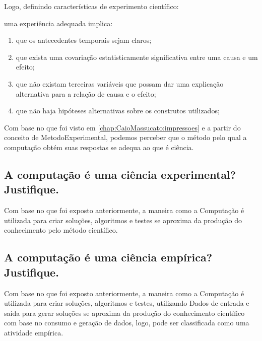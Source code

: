 Logo, definindo características de experimento científico:

uma experiência adequada implica:

\begin{enumerate}
    \item que os antecedentes temporais sejam claros;
    \item que exista uma covariação estatisticamente significativa entre uma causa e um efeito;
    \item que não existam terceiras variáveis que possam dar uma explicação alternativa para a relação de causa e o efeito;
    \item que não haja hipóteses alternativas sobre os construtos utilizados;
\end{enumerate}

Com base no que foi visto em \ref{chap:CaioMassucato:impressoes} e a partir do conceito de \gls{MetodoExperimental}, podemos perceber que o método pelo qual a computação obtém suas respostas se adequa ao que é ciência.

\subsection{A computação é uma ciência experimental? Justifique. }

Com base no que foi exposto anteriormente, a maneira como a Computação é utilizada para criar soluções, algoritmos e testes se aproxima da produção do conhecimento pelo método científico.

\subsection{A computação é uma ciência empírica? Justifique. }

Com base no que foi exposto anteriormente, a maneira como a Computação é utilizada para criar soluções, algoritmos e testes, utilizando \gls{Dados} de entrada e saída para gerar soluções se aproxima da produção do conhecimento científico com base no consumo e geração de dados, logo, pode ser classificada como uma atividade empírica.